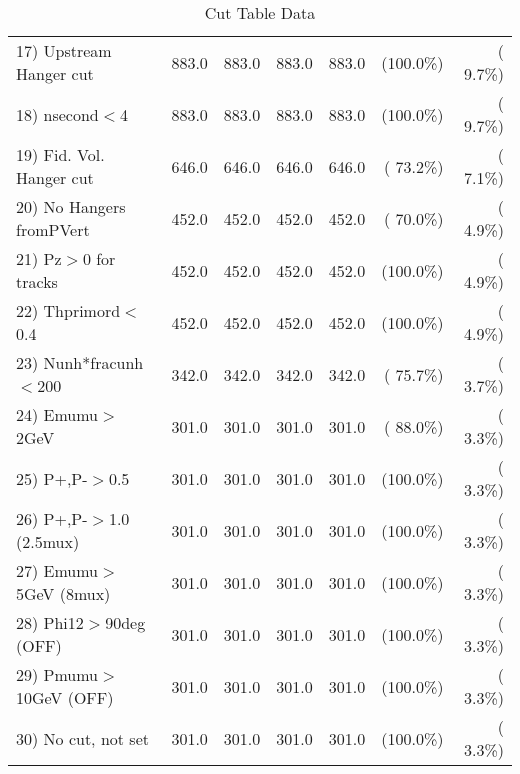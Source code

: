 \begin{table}[h!]
\begin{tabular}{||l||r|r|r|r|r|r||}
 17) Upstream Hanger cut  &        883.0 &        883.0 &        883.0 &        883.0 & (100.0\%) & (  9.7\%) \\
 18) nsecond$<$4          &        883.0 &        883.0 &        883.0 &        883.0 & (100.0\%) & (  9.7\%) \\
 19) Fid. Vol. Hanger cut &        646.0 &        646.0 &        646.0 &        646.0 & ( 73.2\%) & (  7.1\%) \\
 20) No Hangers fromPVert &        452.0 &        452.0 &        452.0 &        452.0 & ( 70.0\%) & (  4.9\%) \\
 21) Pz$>$0 for tracks    &        452.0 &        452.0 &        452.0 &        452.0 & (100.0\%) & (  4.9\%) \\
 22) Thprimord$<$0.4      &        452.0 &        452.0 &        452.0 &        452.0 & (100.0\%) & (  4.9\%) \\
 23) Nunh*fracunh$<$200   &        342.0 &        342.0 &        342.0 &        342.0 & ( 75.7\%) & (  3.7\%) \\
 24) Emumu$>$2GeV         &        301.0 &        301.0 &        301.0 &        301.0 & ( 88.0\%) & (  3.3\%) \\
 25) P+,P-$>$0.5          &        301.0 &        301.0 &        301.0 &        301.0 & (100.0\%) & (  3.3\%) \\
 26) P+,P-$>$1.0 (2.5mux) &        301.0 &        301.0 &        301.0 &        301.0 & (100.0\%) & (  3.3\%) \\
 27) Emumu$>$5GeV  (8mux) &        301.0 &        301.0 &        301.0 &        301.0 & (100.0\%) & (  3.3\%) \\
 28) Phi12$>$90deg  (OFF) &        301.0 &        301.0 &        301.0 &        301.0 & (100.0\%) & (  3.3\%) \\
 29) Pmumu$>$10GeV  (OFF) &        301.0 &        301.0 &        301.0 &        301.0 & (100.0\%) & (  3.3\%) \\
 30) No cut, not set      &        301.0 &        301.0 &        301.0 &        301.0 & (100.0\%) & (  3.3\%) \\
 \hline
 \hline
 \end{tabular}
 \caption{Cut Table  Data     }
 \label{tab-cutcohjpsi-mumu_data}
 \end{table}

